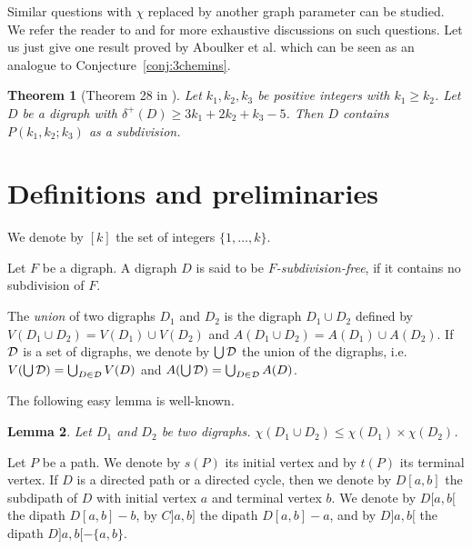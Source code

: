 \documentclass[utf8,10pt]{article}
\theoremstyle{plain}
\newtheorem{theorem}{Theorem}
\newtheorem{lemma}[theorem]{Lemma}
\theoremstyle{definition}
\theoremstyle{remark}
\begin{document}
\medskip

Similar questions with $\chi$ replaced by another graph parameter can be studied.
We refer the reader to \cite{AC+16} and \cite{CHLN16} for more exhaustive discussions on such questions.
Let us just give one result proved by Aboulker et al. \cite{AC+16} which can be seen as an analogue to Conjecture~\ref{conj:3chemins}.

\begin{theorem}[Theorem 28 in \cite{AC+16}]
Let $k_1,k_2,k_3$ be  positive integers with $k_1 \ge k_2$.
Let $D$ be a digraph with $\delta^+(D) \geq 3k_1+2k_2+k_3-5$. Then $D$ contains $P(k_1,k_2;k_3)$ as a subdivision.
\end{theorem}


\section{Definitions and preliminaries}


We denote by $[k]$ the set of integers $\{1, \dots , k\}$.



Let $F$ be a digraph.
A digraph $D$ is said to be {\it $F$-subdivision-free}, if it contains no subdivision of $F$.

The {\it union} of two digraphs $D_1$ and $D_2$ is the digraph  $D_1\cup D_2$ defined by $V(D_1\cup D_2) = V(D_1)\cup V(D_2)$ and 
$A(D_1\cup D_2) = A(D_1)\cup A(D_2)$.
If ${\cal D}$ is a set of digraphs, we denote by $\bigcup {\cal D}$ the union of the digraphs, i.e. $V(\bigcup {\cal D}) =\bigcup_{D\in {\cal D}} V(D)$
and $A(\bigcup {\cal D}) =\bigcup_{D\in {\cal D}} A(D)$.


The following easy lemma is well-known.

\begin{lemma}\label{lem:decomp}
Let $D_1$ and $D_2$ be two digraphs.
$\chi(D_1\cup D_2) \leq \chi(D_1)\times \chi(D_2)$.
\end{lemma}




Let $P$ be a path. We denote by $s(P)$ its initial vertex and by $t(P)$ its terminal vertex.
If $D$ is a directed path or a directed cycle, then we denote by $D[a,b]$ the subdipath of $D$ with initial vertex $a$ and terminal vertex $b$.
We denote by $D[a,b[$ the dipath $D[a,b] -b$, by $C]a,b]$ the dipath $D[a,b] -a$, and by $D]a,b[$ the dipath $D]a,b[ -\{a,b\}$.

\medskip

\end{document}
